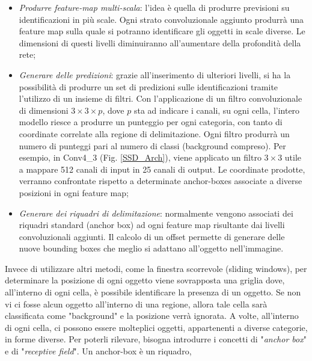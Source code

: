 \begin{itemize}
    \item \emph{Produrre feature-map multi-scala}: l'idea è quella di produrre previsioni 
    su identificazioni in più scale. Ogni strato convoluzionale aggiunto 
    produrrà una feature map sulla quale si potranno identificare gli 
    oggetti in scale diverse. Le dimensioni di questi livelli diminuiranno 
    all'aumentare della profondità della rete;
    \item \emph{Generare delle predizioni}: grazie all'inserimento di ulteriori livelli, si 
    ha la possibilità di produrre un set di predizioni sulle identificazioni 
    tramite l'utilizzo di un insieme di filtri. Con l'applicazione di un 
    filtro convoluzionale di dimensioni $3\times{3}\times{p}$, dove $p$ sta ad indicare i 
    canali, su ogni cella, l'intero modello riesce a produrre un punteggio 
    per ogni categoria, con tanto di coordinate correlate alla regione di 
    delimitazione. Ogni filtro produrrà un numero di punteggi pari al 
    numero di classi (background compreso). Per esempio, in Conv4\_3 
    (Fig. \ref{SSD_Arch}), viene applicato un filtro $3\times{3}$ utile a mappare 512 canali 
    di input in 25 canali di output. Le coordinate prodotte, verranno 
    confrontate rispetto a determinate anchor-boxes associate a diverse 
    posizioni in ogni feature map;
    \item \emph{Generare dei riquadri di delimitazione}: normalmente vengono associati 
    dei riquadri standard (anchor box) ad ogni feature map risultante 
    dai livelli convoluzionali aggiunti. Il calcolo di un offset permette di 
    generare delle nuove bounding boxes che meglio si adattano all'oggetto 
    nell'immagine. 
\end{itemize}
Invece di utilizzare altri metodi, come la finestra scorrevole (sliding windows), 
per determinare la posizione di ogni oggetto viene sovrapposta una griglia 
dove, all'interno di ogni cella, è possibile identificare la presenza di un oggetto. 
Se non vi ci fosse alcun oggetto all'interno di una regione, allora tale cella 
sarà classificata come "background" e la posizione verrà ignorata. A volte, 
all'interno di ogni cella, ci possono essere molteplici oggetti, appartenenti a 
diverse categorie, in forme diverse. Per poterli rilevare, bisogna introdurre i 
concetti di "\emph{anchor box}" e di "\emph{receptive field}". Un anchor-box è un riquadro, 
